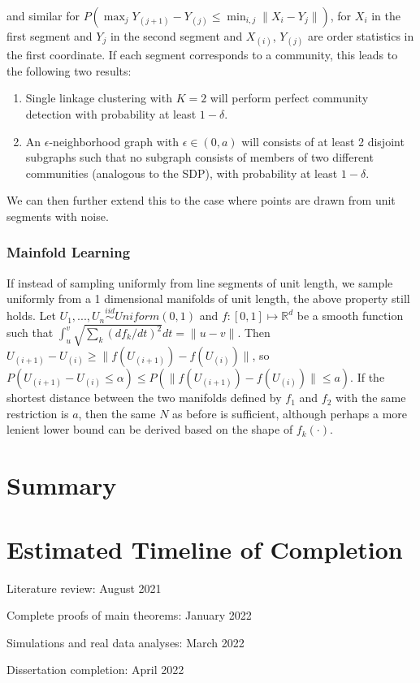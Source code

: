 \documentclass[
  11pt,
]{article}
\begin{document}
and similar for
\(P(\max_j Y_{(j+1)} - Y_{(j)} \leq \min_{i, j} \|X_i - Y_j\|)\), for
\(X_i\) in the first segment and \(Y_j\) in the second segment and
\(X_{(i)}\), \(Y_{(j)}\) are order statistics in the first coordinate.
If each segment corresponds to a community, this leads to the following
two results:

\begin{enumerate}
\def\labelenumi{\arabic{enumi}.}
\item
  Single linkage clustering with \(K = 2\) will perform perfect
  community detection with probability at least \(1 - \delta\).
\item
  An \(\epsilon\)-neighborhood graph with \(\epsilon \in (0, a)\) will
  consists of at least 2 disjoint subgraphs such that no subgraph
  consists of members of two different communities (analogous to the
  SDP), with probability at least \(1 - \delta\).
\end{enumerate}

We can then further extend this to the case where points are drawn from
unit segments with noise.

\hypertarget{mainfold-learning}{%
\subsubsection{Mainfold Learning}\label{mainfold-learning}}

If instead of sampling uniformly from line segments of unit length, we
sample uniformly from a 1 dimensional manifolds of unit length, the
above property still holds. Let
\(U_1, ..., U_n \stackrel{iid}{\sim} Uniform(0, 1)\) and
\(f : [0, 1] \mapsto \mathbb{R}^d\) be a smooth function such that
\(\int_u^v \sqrt{\sum_k (df_k / dt)^2} dt = \|u - v\|\). Then
\(U_{(i+1)} - U_{(i)} \geq \|f(U_{(i+1)}) - f(U_{(i)})\|\), so
\(P(U_{(i+1)} - U_{(i)} \leq \alpha) \leq P(\|f(U_{(i+1)}) - f(U_{(i)})\| \leq a)\).
If the shortest distance between the two manifolds defined by \(f_1\)
and \(f_2\) with the same restriction is \(a\), then the same \(N\) as
before is sufficient, although perhaps a more lenient lower bound can be
derived based on the shape of \(f_k(\cdot)\).

\hypertarget{summary}{%
\section{Summary}\label{summary}}

\hypertarget{estimated-timeline-of-completion}{%
\section{Estimated Timeline of
Completion}\label{estimated-timeline-of-completion}}

Literature review: August 2021

Complete proofs of main theorems: January 2022

Simulations and real data analyses: March 2022

Dissertation completion: April 2022

\newpage

\renewcommand\refname{References}
  
\end{document}
